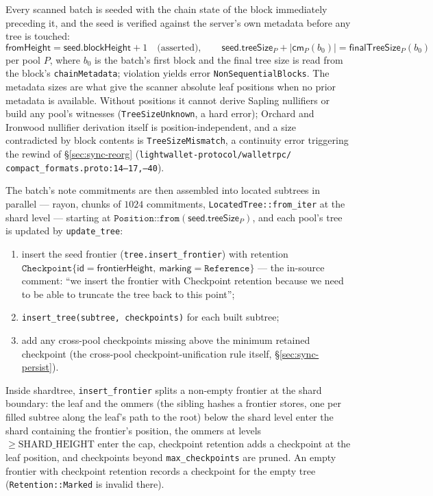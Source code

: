 \documentclass[11pt,a4paper]{article}
\theoremstyle{definition}
\begin{document}
Every scanned batch is seeded with the chain state of the block
immediately preceding it, and the seed is verified against the server's
own metadata before any tree is touched:
\[
\mathsf{fromHeight} = \mathsf{seed}.\mathsf{blockHeight} + 1
\quad\text{(asserted)}, \qquad
\mathsf{seed}.\mathsf{treeSize}_P + |\mathsf{cm}_P(b_0)| =
\mathsf{finalTreeSize}_P(b_0)
\]
per pool $P$, where $b_0$ is the batch's first block and the final
tree size is read from the block's \texttt{chainMetadata}; violation
yields error \texttt{NonSequentialBlocks}. The metadata sizes are
what give the scanner absolute leaf positions when no prior metadata is
available. Without positions it cannot derive Sapling nullifiers or
build any pool's witnesses (\texttt{TreeSizeUnknown}, a hard error);
Orchard and Ironwood nullifier derivation itself is position-independent,
and a size contradicted by block contents is \texttt{TreeSizeMismatch},
a continuity error triggering the rewind of \S\ref{sec:sync-reorg}
(\texttt{lightwallet-protocol/walletrpc/}\allowbreak
\texttt{compact\_\allowbreak formats.proto:14--17,--40}).

The batch's note commitments are then assembled into located subtrees in
parallel --- \textsf{rayon}, chunks of $1024$ commitments,
\texttt{LocatedTree::from\_iter} at the shard level --- starting at
$\texttt{Position::from}(\mathsf{seed}.\mathsf{treeSize}_P)$, and each
pool's tree is updated by \texttt{update\_tree}:
\begin{enumerate}[label=(\arabic*)]
\item insert the seed frontier (\texttt{tree.insert\_frontier}) with
  retention
  $\texttt{Checkpoint}\{\mathsf{id} = \mathsf{frontierHeight},\
  \mathsf{marking} = \texttt{Reference}\}$ --- the in-source comment:
  ``we insert the frontier with Checkpoint retention because we need to
  be able to truncate the tree back to this point'';
\item \texttt{insert\_tree(subtree, checkpoints)} for each built
  subtree;
\item add any cross-pool checkpoints missing above the minimum retained
  checkpoint
  (the cross-pool
  checkpoint-unification rule itself, \S\ref{sec:sync-persist}).
\end{enumerate}
Inside \textsf{shardtree}, \texttt{insert\_frontier} splits a non-empty
frontier at the shard boundary: the leaf and the ommers (the sibling
hashes a frontier stores, one per filled subtree along the leaf's path
to the root) below the shard level enter the shard containing the
frontier's position, the ommers at
levels $\ge \mathrm{SHARD\_HEIGHT}$ enter the cap, checkpoint retention
adds a checkpoint at the leaf position, and checkpoints beyond
\texttt{max\_checkpoints} are pruned. An empty frontier with checkpoint
retention records a checkpoint for the empty tree
(\texttt{Retention::Marked} is invalid there).
\end{document}
